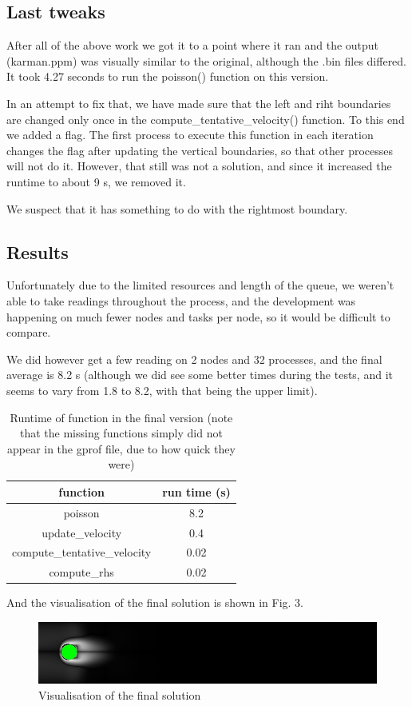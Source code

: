 \documentclass[11pt,journal]{article}
\begin{document}
	\subsection{Last tweaks}
	After all of the above work we got it to a point where it ran and the output (karman.ppm) was visually similar to the original, although the .bin files differed. It took 4.27 seconds to run the poisson() function on this version.
	
	In an attempt to fix that, we have made sure that the left and riht boundaries are changed only once in the compute\_tentative\_velocity() function. To this end we added a flag. The first process to execute this function in each iteration changes the flag after updating the vertical boundaries, so that other processes will not do it. However, that still was not a solution, and since it increased the runtime to about 9 s, we removed it.
	
	We suspect that it has something to do with the rightmost boundary.
	
	
	\subsection{Results}
	Unfortunately due to the limited resources and length of the queue, we weren't able to take readings throughout the process, and the development was happening on much fewer nodes and tasks per node, so it would be difficult to compare.
	
	We did however get a  few reading on 2 nodes and 32 processes, and the final average is 8.2 s (although we did see some better times during the tests, and it seems to vary from 1.8 to 8.2, with that being the upper limit).
	
	\begin{table}[h]
		\centering
		\begin{tabular}{c|c}
			function & run time (s)  \\
			\hline
			poisson & 8.2 \\
			update\_velocity & 0.4 \\
			compute\_tentative\_velocity & 0.02 \\
			compute\_rhs & 0.02 \\
		\end{tabular}
	\caption{Runtime of function in the final version (note that the missing functions simply did not appear in the gprof file, due to how quick they were)}
	\end{table}
	
	
	And the visualisation of the final solution is shown in Fig. 3.
	\begin{figure}[h]
		\centering
		\includegraphics[scale=0.7]{karman_final7.jpg}
		\caption{Visualisation of the final solution}
	\end{figure}
\end{document}
